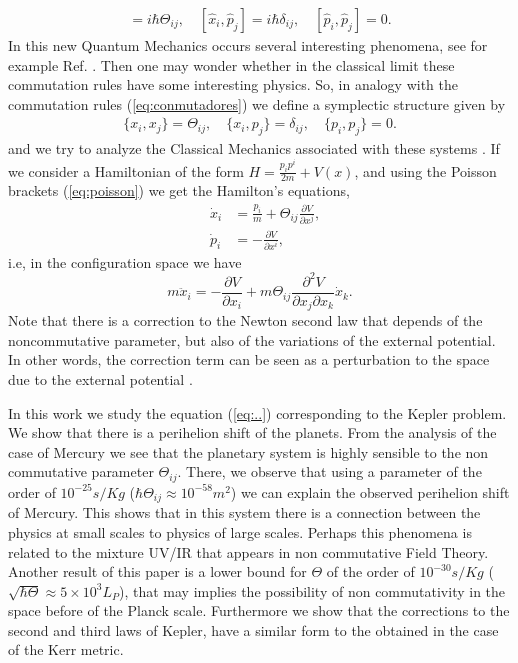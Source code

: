 \documentclass[a4paper,12pt]{article}
\newcommand{\rof}[1]{(\ref{eq:#1})}
\begin{document}
\begin{eqnarray}
[\hat x_{i},\hat x_{j}]=i\hbar \Theta_{ij},\quad
[\hat x_{i},\hat p_{j}]=i\hbar \delta_{ij}, \quad [\hat p_{i},\hat p_{j}]=0. \label{eq:conmutadores}
\end{eqnarray}
In this new Quantum Mechanics occurs several interesting
phenomena, see for example Ref.  \cite{chaichian:gnus}. Then one
may wonder whether in the classical limit these commutation rules
have some interesting physics. So, in analogy with the commutation
rules (\ref{eq:conmutadores}) we define a symplectic structure
given by
\begin{eqnarray}
\{ x_{i}, x_{j}\}= \Theta_{ij},\quad \{ x_{i}, p_{j}\}= \delta_{ij},
\quad \{ p_{i}, p_{j}\}= 0. \label{eq:poisson}
\end{eqnarray}
and we try to analyze the Classical Mechanics associated with
these systems  \cite{david:gnus}. If we consider a Hamiltonian of
the form $H=\frac{p_ip^i}{2m}+V(x)$, and using the Poisson
brackets \rof{poisson} we get the Hamilton's equations,
\begin{eqnarray}
&\dot x_{i}&=\frac{p_{i}}{m}+\Theta_{ij}\frac{\partial V}{\partial x^{j}}, \label{eq:,}\\
&\dot p_{i}&=-\frac{\partial V}{\partial x^{i}},   \label{eq:h1}
\end{eqnarray}
i.e, in the configuration space we have
\begin{equation}
m\ddot x_{i}=-\frac{\partial V}{\partial x_{i}}+
m\Theta_{ij}\frac{\partial^{2 } V } { \partial x_{j}\partial x_{k}}
\dot x_{k }. \label{eq:..}
\end{equation}
Note that there is a correction to the Newton second law that
depends of the noncommutative parameter, but also of the
variations of the external potential. In other words, the
correction term can be seen as a perturbation to the space due to
the external potential \cite{david:gnus}.

In this work we study the equation \rof{..} corresponding to the
Kepler problem. We show that there is a perihelion shift of the
planets. From the analysis of the case of Mercury we see that the
planetary system is highly sensible to the non commutative
parameter $\Theta_{ij}$. There, we observe that using a parameter
of the order of $10^{-25}s/Kg$ ($\hbar\Theta_{ij}\approx
10^{-58}m^{2}$) we can explain the observed perihelion shift of
Mercury. This shows that in this system there is a connection
between the physics at small scales to physics of large scales.
Perhaps this phenomena is related to the mixture UV/IR that
appears in non commutative Field Theory. Another result of this
paper is a lower bound for $\Theta$ of the order of $10^{-30}s/Kg$
($\sqrt{\hbar\Theta}\approx 5 \times 10^{3}L_{P}$), that may
implies the possibility of non commutativity in the space before
of the Planck scale. Furthermore we show that the corrections to
the second and third laws of Kepler, have a similar form to the
obtained in the case of the Kerr metric.
\end{document}
